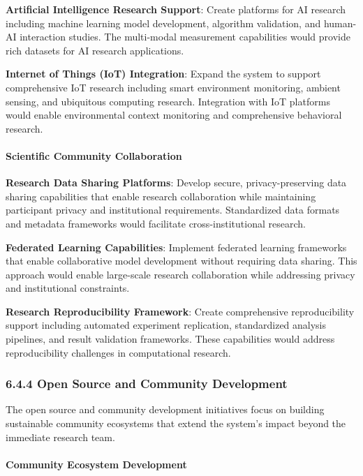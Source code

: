 \documentclass[11pt,a4paper]{article}
\begin{document}
\textbf{Artificial Intelligence Research Support}: Create platforms for AI research including machine learning model
development, algorithm validation, and human-AI interaction studies. The multi-modal measurement capabilities would
provide rich datasets for AI research applications.

\textbf{Internet of Things (IoT) Integration}: Expand the system to support comprehensive IoT research including smart
environment monitoring, ambient sensing, and ubiquitous computing research. Integration with IoT platforms would enable
environmental context monitoring and comprehensive behavioral research.

\paragraph{Scientific Community Collaboration}

\textbf{Research Data Sharing Platforms}: Develop secure, privacy-preserving data sharing capabilities that enable research
collaboration while maintaining participant privacy and institutional requirements. Standardized data formats and
metadata frameworks would facilitate cross-institutional research.

\textbf{Federated Learning Capabilities}: Implement federated learning frameworks that enable collaborative model development
without requiring data sharing. This approach would enable large-scale research collaboration while addressing privacy
and institutional constraints.

\textbf{Research Reproducibility Framework}: Create comprehensive reproducibility support including automated experiment
replication, standardized analysis pipelines, and result validation frameworks. These capabilities would address
reproducibility challenges in computational research.

\subsubsection{6.4.4 Open Source and Community Development}

The open source and community development initiatives focus on building sustainable community ecosystems that extend the
system's impact beyond the immediate research team.

\paragraph{Community Ecosystem Development}
\end{document}
